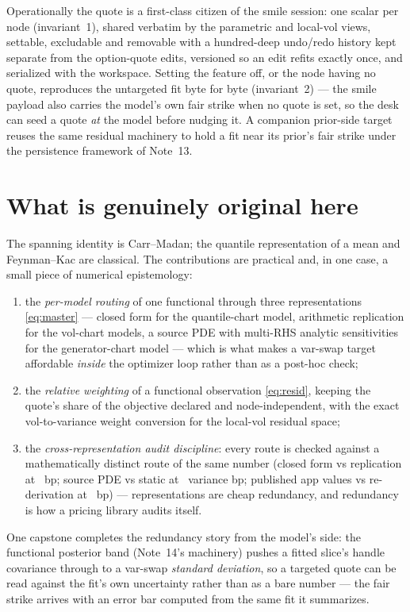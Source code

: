 \documentclass[11pt]{article}
\begin{document}
Operationally the quote is a first-class citizen of the smile session:
one scalar per node (invariant~1), shared verbatim by the parametric and
local-vol views, settable, excludable and removable with a hundred-deep
undo/redo history kept separate from the option-quote edits, versioned
so an edit refits exactly once, and serialized with the workspace.
Setting the feature off, or the node having no quote, reproduces the
untargeted fit byte for byte (invariant~2) --- the smile payload also
carries the model's own fair strike when no quote is set, so the desk
can seed a quote \emph{at} the model before nudging it.  A companion
prior-side target reuses the same residual machinery to hold a fit near
its prior's fair strike under the persistence framework of Note~13.

\section{What is genuinely original here}
\label{sec:original}

The spanning identity is Carr--Madan; the quantile representation of a
mean and Feynman--Kac are classical.  The contributions are practical
and, in one case, a small piece of numerical epistemology:
\begin{enumerate}[leftmargin=1.6em]
\item the \emph{per-model routing} of one functional through three
representations \eqref{eq:master} --- closed form for the quantile-chart
model, arithmetic replication for the vol-chart models, a source PDE
with multi-RHS analytic sensitivities for the generator-chart model ---
which is what makes a var-swap target affordable \emph{inside} the
optimizer loop rather than as a post-hoc check;
\item the \emph{relative weighting} of a functional observation
\eqref{eq:resid}, keeping the quote's share of the objective declared
and node-independent, with the exact vol-to-variance weight conversion
for the local-vol residual space;
\item the \emph{cross-representation audit discipline}: every route is
checked against a mathematically distinct route of the same number
(closed form vs replication at \vsragreebp\ bp; source PDE vs static at
\vsrlvagreebp\ variance bp; published app values vs re-derivation at
\vsrheroagreebp\ bp) --- representations are cheap redundancy, and
redundancy is how a pricing library audits itself.
\end{enumerate}
One capstone completes the redundancy story from the model's side: the
functional posterior band (Note~14's machinery) pushes a fitted slice's
handle covariance through to a var-swap \emph{standard deviation}, so a
targeted quote can be read against the fit's own uncertainty rather than
as a bare number --- the fair strike arrives with an error bar computed
from the same fit it summarizes.
\end{document}
